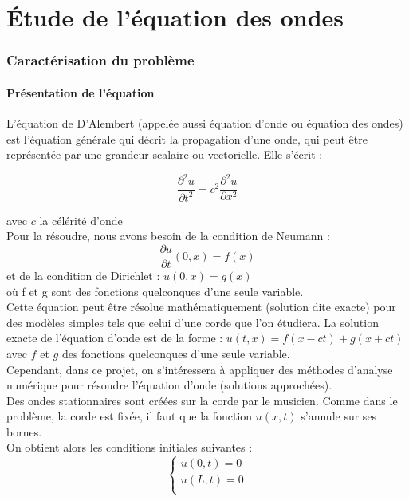 \part{Étude de l'équation des ondes}

\section{Caractérisation du problème}

\subsection{Présentation de l'équation}

L'équation de D'Alembert (appelée aussi équation d'onde ou équation des ondes) est l'équation générale qui décrit la propagation d'une onde, qui peut être représentée par une grandeur scalaire ou vectorielle. 
Elle s'écrit : 

\begin{equation*}
\frac{\partial^2u}{\partial t^2} = c^{2}\frac{\partial^2u}{\partial x^2}
\end{equation*}
 
    avec $c$ la célérité d'onde \\
Pour la résoudre, nous avons besoin de la condition de Neumann :
\begin{equation*}
\frac{\partial u}{\partial t} (0,x) = f(x)
\end{equation*}
et de la condition de Dirichlet : $u(0,x) = g(x)$\\
où f et g sont des fonctions quelconques d'une seule variable.\\

Cette équation peut être résolue mathématiquement (solution dite exacte) pour des modèles simples tels que celui d'une corde que l'on étudiera. La solution exacte de l'équation d'onde est de la forme :
$u(t,x) = f(x-ct) + g(x+ct)$ avec $f$ et $g$ des fonctions quelconques d'une seule variable.  \\

Cependant, dans ce projet, on s'intéressera à appliquer des méthodes d'analyse numérique pour résoudre l'équation d'onde (solutions approchées).\\

Des ondes stationnaires sont créées sur la corde par le musicien. Comme dans le problème, la corde est fixée, il faut que la fonction $u(x,t)$ s'annule sur ses bornes.\\
On obtient alors les conditions initiales suivantes :\\
\begin{equation*}
\left \{
\begin{array}{rcl}
u(0,t)=0\\
u(L,t)=0\\
\end{array}
\right.
\end{equation*}\\


